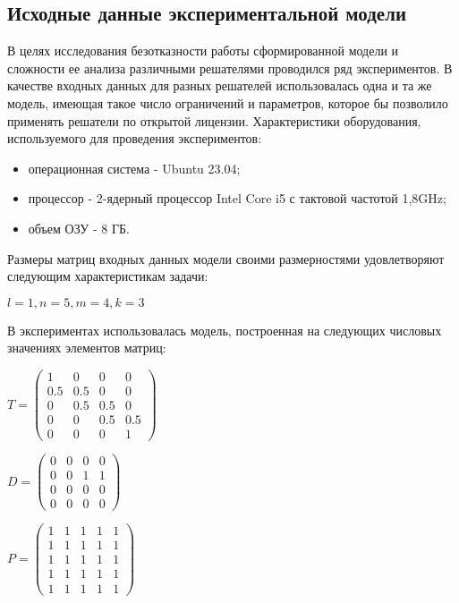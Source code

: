 \subsection*{Исходные данные экспериментальной модели}
В целях исследования безотказности работы сформированной модели и сложности ее анализа различными решателями проводился ряд экспериментов. В качестве входных данных для разных решателей использовалась одна и та же модель, имеющая такое число ограничений и параметров, которое бы позволило применять решатели по открытой лицензии.
Характеристики оборудования, используемого для проведения экспериментов:
\begin{itemize}
  \item операционная система - Ubuntu 23.04;
  \item процессор - 2-ядерный процессор Intel Core i5 с тактовой частотой 1,8GHz;
  \item объем ОЗУ - 8 ГБ.
\end{itemize}

Размеры матриц входных данных модели своими размерностями удовлетворяют следующим характеристикам задачи:
\begin{center}
  $l = 1, n = 5, m = 4, k = 3$
\end{center}

В экспериментах использовалась модель, построенная на следующих числовых значениях элементов матриц:
\begin{center}
  $
  T = 
  \begin{pmatrix}
      1 &   0 &   0 & 0   \\
    0.5 & 0.5 &   0 & 0   \\
      0 & 0.5 & 0.5 & 0   \\
      0 &   0 & 0.5 & 0.5 \\
      0 &   0 &   0 & 1 
  \end{pmatrix}
  $
\end{center}

\begin{center}
  $
  D = 
  \begin{pmatrix}
    0 & 0 & 0 & 0   \\
    0 & 0 & 1 & 1   \\
    0 & 0 & 0 & 0   \\
    0 & 0 & 0 & 0 
  \end{pmatrix}
  $
\end{center}

\begin{center}
  $
  P = 
  \begin{pmatrix}
    1 & 1 & 1 & 1 & 1   \\
    1 & 1 & 1 & 1 & 1   \\
    1 & 1 & 1 & 1 & 1   \\
    1 & 1 & 1 & 1 & 1   \\
    1 & 1 & 1 & 1 & 1 
  \end{pmatrix}
  $
\end{center}

